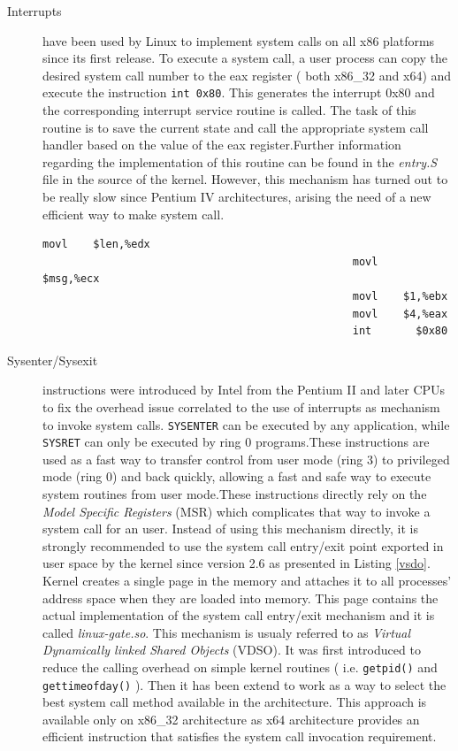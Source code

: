 \begin{description}

\item[Interrupts] have been used by Linux to implement system calls on all x86 platforms since its first release. To execute a system call, a user process can copy the desired system call number to the eax register ( both x86\_32 and x64) and execute the instruction \lstinline$int 0x80$. This generates the interrupt 0x80 and the corresponding interrupt service routine is called. The task of this routine is to save the current state and call the appropriate system call handler based on the value of the eax register.Further information regarding the implementation of this routine can be found in the \emph{entry.S} file in the source of the kernel. However, this mechanism has turned out to be really slow since Pentium IV architectures, arising the need of a new efficient way to make system call. 


\begin{center}
\lstset{escapechar=@,style=asm}
\begin{lstlisting}[label=list:int,caption=Write system call invocation via interrupt on x86\_32 architecture]
  											     movl    $len,%edx       
  							  					 movl    $msg,%ecx       
       				 							 movl    $1,%ebx        
       				 			 				 movl    $4,%eax         
      							 				 int 	   $0x80
\end{lstlisting}
\end{center}




\item[Sysenter/Sysexit] instructions were introduced by Intel from the Pentium II and later CPUs to fix the overhead issue correlated to the use of interrupts as mechanism to invoke system calls. \lstinline$SYSENTER$ can be executed by any application, while  \lstinline$SYSRET$ can only be executed by ring 0 programs.These instructions are used as a fast way to transfer control from user mode (ring 3) to privileged mode (ring 0) and back quickly, allowing a fast and safe way to execute system routines from user mode.These instructions directly rely on the \textit{Model Specific Registers} (MSR) \cite{Intel} which complicates that way to invoke a system call for an user. Instead of using this mechanism directly, it is strongly recommended to use the system call entry/exit point exported in user space by the kernel since version 2.6 as presented in Listing \ref{vsdo}. Kernel creates a single page in the memory and attaches it to all processes' address space when they are loaded into memory. This page contains the actual implementation of the system call entry/exit mechanism and it is called \emph{linux-gate.so}. This mechanism is usualy referred to as  \textit{Virtual Dynamically linked Shared Objects} (VDSO). It was first introduced to reduce the calling overhead on simple kernel routines ( i.e. \lstinline$getpid()$ and \lstinline$gettimeofday()$ ). Then it has been extend to work as a way to select the best system call method available in the architecture. This approach is available only on x86\_32 architecture as x64 architecture  provides an efficient instruction that satisfies the system call invocation requirement.  



\end{description}
